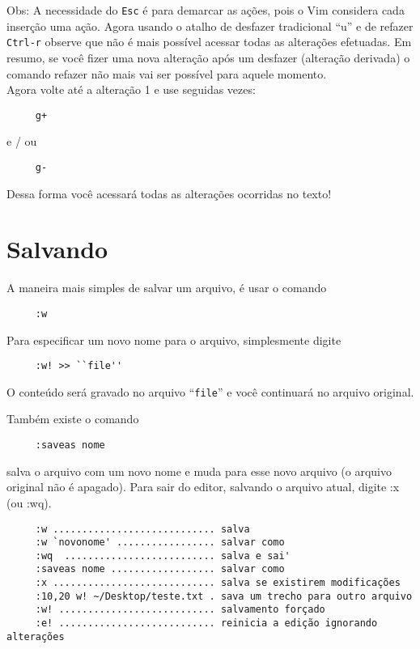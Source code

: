 Obs: A necessidade do {\tt Esc} é para demarcar as ações, pois o Vim
considera cada inserção uma ação.  Agora usando o atalho de desfazer
tradicional ``u'' e de refazer {\tt Ctrl-r} observe que não é mais possível
acessar todas as alterações efetuadas. Em resumo, se você fizer uma
nova alteração após um desfazer (alteração derivada) o comando refazer
não mais vai ser possível para aquele momento. \\

Agora volte até a alteração 1 e use seguidas vezes:

\begin{verbatim}
     g+
\end{verbatim}

e / ou

\begin{verbatim}
     g-
\end{verbatim}

Dessa forma você acessará todas as alterações ocorridas no texto!

\section{Salvando}

A maneira mais simples de salvar um arquivo, é usar o comando

\begin{verbatim}
     :w
\end{verbatim}


Para especificar um novo nome para o arquivo, simplesmente digite

\begin{verbatim}
     :w! >> ``file''
\end{verbatim}

O conteúdo será gravado no arquivo ``{\tt file}'' e você continuará no arquivo original.

Também existe o comando

\begin{verbatim}
     :saveas nome
\end{verbatim}

salva o arquivo com um novo nome e muda para esse novo arquivo (o arquivo original não é apagado).
Para sair do editor, salvando o arquivo atual, digite :x (ou :wq).

\begin{verbatim}
     :w ............................ salva
     :w `novonome' ................. salvar como
     :wq  .......................... salva e sai'
     :saveas nome .................. salvar como
     :x ............................ salva se existirem modificações
     :10,20 w! ~/Desktop/teste.txt . sava um trecho para outro arquivo
     :w! ........................... salvamento forçado
     :e! ........................... reinicia a edição ignorando alterações
\end{verbatim}

